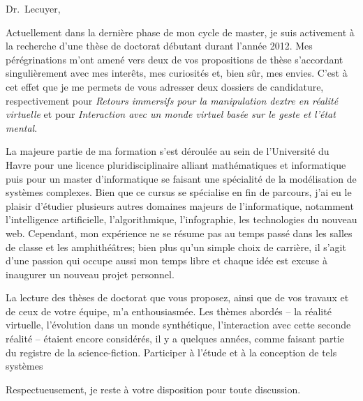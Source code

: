 \documentclass{letter}
\begin{document}
\begin{letter}{}

\opening{Dr.\ Lecuyer,}

Actuellement dans la dernière phase de mon cycle de master, je suis
activement à la recherche d'une thèse de doctorat débutant durant
l'année 2012. Mes pérégrinations m'ont amené vers deux de vos
propositions de thèse s'accordant singulièrement avec mes interêts,
mes curiosités et, bien sûr, mes envies. C'est à cet effet que je me
permets de vous adresser deux dossiers de candidature, respectivement
pour \textit{Retours immersifs pour la manipulation dextre en réalité
  virtuelle} et pour \textit{Interaction avec un monde virtuel basée
  sur le geste et l'état mental}.

La majeure partie de ma formation s'est déroulée au sein de
l'Université du Havre pour une licence pluridisciplinaire alliant
mathématiques et informatique puis pour un master d'informatique se
faisant une spécialité de la modélisation de systèmes complexes. Bien
que ce cursus se spécialise en fin de parcours, j'ai eu le plaisir
d'étudier plusieurs autres domaines majeurs de l'informatique,
notamment l'intelligence artificielle, l'algorithmique, l'infographie,
les technologies du nouveau web. Cependant, mon expérience ne se
résume pas au temps passé dans les salles de classe et les
amphithéâtres; bien plus qu'un simple choix de carrière, il s'agit
d'une passion qui occupe aussi mon temps libre et chaque idée est
excuse à inaugurer un nouveau projet personnel.

La lecture des thèses de doctorat que vous proposez, ainsi que de vos
travaux et de ceux de votre équipe, m'a enthousiasmée. Les thèmes
abordés -- la réalité virtuelle, l'évolution dans un monde
synthétique, l'interaction avec cette seconde réalité -- étaient
encore considérés, il y a quelques années, comme faisant partie du
registre de la science-fiction. Participer à l'étude et à la
conception de tels systèmes

\closing{Respectueusement, je reste à votre disposition pour toute
  discussion.}

\end{letter}
\end{document}
